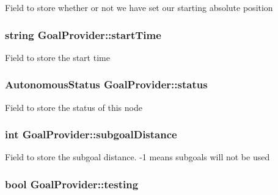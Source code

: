 \-Field to store whether or not we have set our starting absolute position \hypertarget{classGoalProvider_a6329ae18effbfa5a6eddf9956851c973}{
\subsubsection[{start\-Time}]{\setlength{\rightskip}{0pt plus 5cm}string {\bf \-Goal\-Provider\-::start\-Time}}}\label{classGoalProvider_a6329ae18effbfa5a6eddf9956851c973}
\-Field to store the start time \hypertarget{classGoalProvider_aecddfd46c7aba939da77c5a207a97039}{
\subsubsection[{status}]{\setlength{\rightskip}{0pt plus 5cm}\-Autonomous\-Status {\bf \-Goal\-Provider\-::status}}}\label{classGoalProvider_aecddfd46c7aba939da77c5a207a97039}
\-Field to store the status of this node \hypertarget{classGoalProvider_ad4a03daf04350450ceee088c9f5f6c54}{
\subsubsection[{subgoal\-Distance}]{\setlength{\rightskip}{0pt plus 5cm}int {\bf \-Goal\-Provider\-::subgoal\-Distance}}}\label{classGoalProvider_ad4a03daf04350450ceee088c9f5f6c54}
\-Field to store the subgoal distance. -\/1 means subgoals will not be used \hypertarget{classGoalProvider_aefb932adf68011afd36e0796a001c147}{
\subsubsection[{testing}]{\setlength{\rightskip}{0pt plus 5cm}bool {\bf \-Goal\-Provider\-::testing}}}\label{classGoalProvider_aefb932adf68011afd36e0796a001c147}
